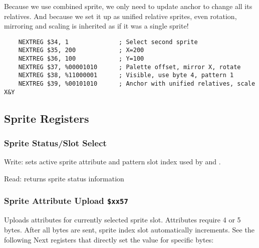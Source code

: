 \documentclass[12pt,twoside,openright,a4paper]{book}
\begin{document}
Because we use combined sprite, we only need to update anchor to change all its relatives. And because we set it up as unified relative sprites, even rotation, mirroring and scaling is inherited as if it was a single sprite!

\begin{lstlisting}
	NEXTREG $34, 1              ; Select second sprite
	NEXTREG $35, 200            ; X=200
	NEXTREG $36, 100            ; Y=100
	NEXTREG $37, %00001010      ; Palette offset, mirror X, rotate
	NEXTREG $38, %11000001      ; Visible, use byte 4, pattern 1
	NEXTREG $39, %00101010      ; Anchor with unified relatives, scale X&Y 
\end{lstlisting}


\pagebreak
\subsection{Sprite Registers}
\label{zx_next_sprite_registers}

\subsubsection{Sprite Status/Slot Select }

Write: sets active sprite attribute and pattern slot index used by  and .

\begin{NextPort}
\end{NextPort}

Read: returns sprite status information

\begin{NextPort}
\end{NextPort}


\subsubsection{Sprite Attribute Upload {\tt \$xx57}}

Uploads attributes for currently selected sprite slot. Attributes require 4 or 5 bytes. After all bytes are sent, sprite index slot automatically increments. See the following Next registers that directly set the value for specific bytes:
\end{document}
